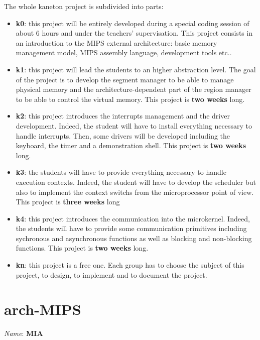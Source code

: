 {\begin{multicols}{2}
The whole kaneton project is subdivided into parts:

\begin{itemize}
  \item
    \textbf{k0}: this project will be entirely developed during a
    special coding session of about 6 hours and under the teachers'
    supervisation. This project consists in an introduction to the
    MIPS external architecture: basic memory management model,
    MIPS assembly language, development tools etc..
  \item
    \textbf{k1}: this project will lead the students to an higher abstraction
    level. The goal of the project is to develop the segment manager to be
    able to manage physical memory and the architecture-dependent part of the
    region manager to be able to control the virtual memory. This project
    is \textbf{two weeks} long.
  \item
    \textbf{k2}: this project introduces the interrupts management and
    the driver development. Indeed, the student will have to install
    everything necessary to handle interrupts. Then, some drivers will
    be developed including the keyboard, the timer and a demonstration shell.
    This project is \textbf{two weeks} long.
  \item
    \textbf{k3}: the students will have to provide everything necessary
    to handle execution contexts. Indeed, the student will have to
    develop the scheduler but also to implement the context switchs from
    the microprocessor point of view. This project is \textbf{three weeks}
    long
  \item
    \textbf{k4}: this project introduces the communication into the
    microkernel. Indeed, the students will have to provide some
    communication primitives including sychronous and asynchronous
    functions as well as blocking and non-blocking functions. This project
    is \textbf{two weeks} long.
  \item
    \textbf{kn}: this project is a free one. Each group has to choose the
    subject of this project, to design, to implement and to document
    the project.
\end{itemize}

%
%

\section{arch-MIPS}

\textit{Name}: \textbf{MIA}


\end{multicols}}
